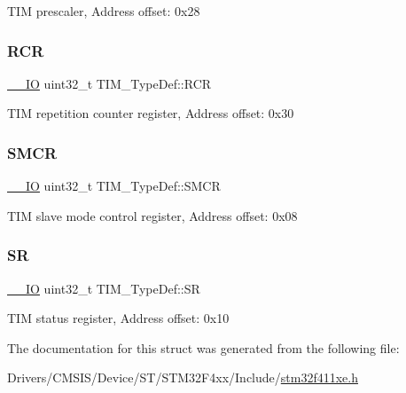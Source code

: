 T\+IM prescaler, Address offset\+: 0x28 \mbox{\label{struct_t_i_m___type_def_ad432e2a315abf68e6c295fb4ebc37534}} 
\subsubsection{\texorpdfstring{R\+CR}{RCR}}
{\footnotesize\ttfamily \hyperlink{core__sc300_8h_aec43007d9998a0a0e01faede4133d6be}{\+\_\+\+\_\+\+IO} uint32\+\_\+t T\+I\+M\+\_\+\+Type\+Def\+::\+R\+CR}

T\+IM repetition counter register, Address offset\+: 0x30 \mbox{\label{struct_t_i_m___type_def_a67d30593bcb68b98186ebe5bc8dc34b1}} 
\subsubsection{\texorpdfstring{S\+M\+CR}{SMCR}}
{\footnotesize\ttfamily \hyperlink{core__sc300_8h_aec43007d9998a0a0e01faede4133d6be}{\+\_\+\+\_\+\+IO} uint32\+\_\+t T\+I\+M\+\_\+\+Type\+Def\+::\+S\+M\+CR}

T\+IM slave mode control register, Address offset\+: 0x08 \mbox{\label{struct_t_i_m___type_def_acedfc978c879835c05ef1788ad26b2ff}} 
\subsubsection{\texorpdfstring{SR}{SR}}
{\footnotesize\ttfamily \hyperlink{core__sc300_8h_aec43007d9998a0a0e01faede4133d6be}{\+\_\+\+\_\+\+IO} uint32\+\_\+t T\+I\+M\+\_\+\+Type\+Def\+::\+SR}

T\+IM status register, Address offset\+: 0x10 

The documentation for this struct was generated from the following file\+:\begin{DoxyCompactItemize}
\item 
Drivers/\+C\+M\+S\+I\+S/\+Device/\+S\+T/\+S\+T\+M32\+F4xx/\+Include/\hyperlink{stm32f411xe_8h}{stm32f411xe.\+h}\end{DoxyCompactItemize}

